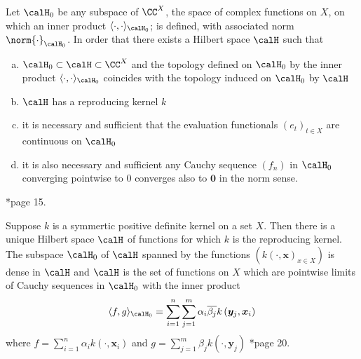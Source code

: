 \begin{thm}\label{theorem: ground-Moore-Aronszajn}
    Let $\calH_0$ be any subspace of $\CC^X$, the space of complex functions on $X$, on which an inner product $\langle \cdot , \cdot \rangle_{\calH_0}$; is defined, with associated norm $\norm{\cdot}_{\calH_0}$. In order that there exists a Hilbert space $\calH$ such that
    \begin{enumerate}[a)]
        \item $\calH_0 \subset \calH \subset \CC^X$ and the topology defined on $\calH_0$ by the inner product $\langle \cdot , \cdot \rangle_{\calH_0}$ coincides with the topology induced on $\calH_0$ by $\calH$
        \item $\calH$ has a reproducing kernel $k$
        \item it is necessary and sufficient that the evaluation functionals $\left( e_t \right)_{t \in X}$ are continuous on $\calH_0$
        \item it is also necessary and sufficient any Cauchy sequence $(f_n)$ in $\calH_0$ converging pointwise to $0$ converges also to $\bm{0}$ in the norm sense.
    \end{enumerate}
    \cite{BerlinetAlain2003RKHS}*{page 15}.
\end{thm}

\begin{thm} \label{theorem: Moore-Aronszajn}
    Suppose $k$ is a symmertic positive definite kernel on a set $X$. Then there is a unique Hilbert space $\calH$ of functions for which $k$ is the reproducing kernel. The subspace $\calH_0$ of $\calH$ spanned by the functions $(k(\cdot , \bm{x})_{x \in X})$ is dense in $\calH$ and $\calH$ is the set of functions on $X$ which are pointwise limits of Cauchy sequences in $\calH_0$ with the inner product
    \begin{equation} \label{eq: inner-prod-Moore-Aronszajn}
        \langle f,g \rangle_{\calH_0} = \sum_{i=1}^{n} \sum_{j=1}^{m} \alpha_i \overline{\beta_j} k \left( \bm{y}_j , \bm{x}_i \right)
    \end{equation}
    where $f = \sum_{i=1}^n \alpha_i k (\cdot , \bm{x}_i)$ and $g = \sum_{j=1}^m \beta_j k (\cdot , \bm{y}_j)$ \cite{BerlinetAlain2003RKHS}*{page 20}.
\end{thm}

